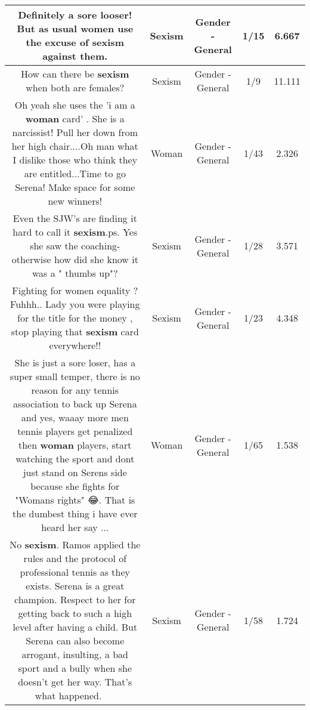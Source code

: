 \documentclass[11pt]{article}
\newlength\mylength
\begin{document}
\begin{center}
\begin{longtable}{|C{.65\mylength}|C{.30\mylength}|C{.12\mylength}|C{.12\mylength}|C{.12\mylength}|}
  \small Definitely a sore looser!  But as usual women use the excuse of \textbf{sexism} against them.\normalsize   & Sexism & Gender - General & 1/15 & 6.667 \\  \hline
  \small How can there be \textbf{sexism} when both are females?\normalsize   & Sexism & Gender - General & 1/9 & 11.111 \\  \hline
  \small Oh yeah she uses the 'i am a \textbf{woman} card' . She is a narcissist! Pull her down from her high chair....Oh man what I dislike those who think they are entitled...Time to go Serena! Make space for some new winners!\normalsize   & Woman & Gender - General & 1/43 & 2.326 \\  \hline
  \small Even the SJW's are finding it hard to call it \textbf{sexism}.ps. Yes she saw the coaching- otherwise how did she know it was a " thumbs up"?\normalsize   & Sexism & Gender - General & 1/28 & 3.571 \\  \hline
  \small Fighting for women equality ? Fuhhh.. Lady you were playing for the title for the money , stop playing that \textbf{sexism} card everywhere!!\normalsize   & Sexism & Gender - General & 1/23 & 4.348 \\  \hline
  \small She is just a sore loser, has a super small temper, there is no reason for any tennis association to back up Serena and yes, waaay more men tennis players get penalized then \textbf{woman} players, start watching the sport and dont just stand on Serens side because she fights for "Womans rights" 😂. That is the dumbest thing i have ever heard her say ...\normalsize   & Woman & Gender - General & 1/65 & 1.538 \\  \hline
  \small No \textbf{sexism}. Ramos applied the rules and the protocol of professional tennis as they exists. Serena is a great champion. Respect to her for getting back to such a high level after having a child. But Serena can also become arrogant, insulting, a bad sport and a bully when she doesn't get her way. That's what happened.🤔🇨🇺🇺🇸\normalsize   & Sexism & Gender - General & 1/58 & 1.724 \\  \hline

\end{longtable}
\end{center}
\end{document}
